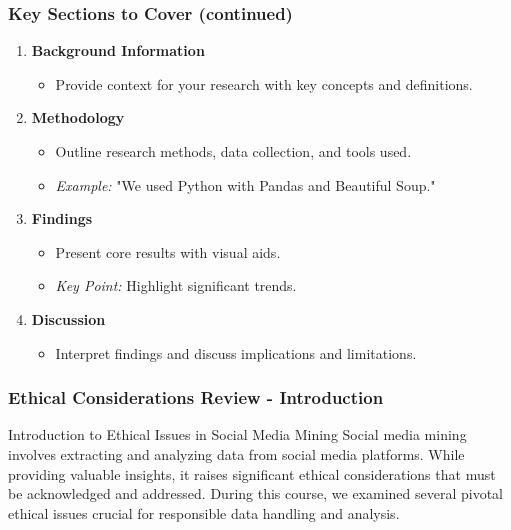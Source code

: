 \documentclass{beamer}
\begin{document}
\begin{frame}[fragile]
    \frametitle{Key Sections to Cover (continued)}
    \begin{enumerate}[resume]
        \item \textbf{Background Information}
            \begin{itemize}
                \item Provide context for your research with key concepts and definitions.
            \end{itemize}

        \item \textbf{Methodology}
            \begin{itemize}
                \item Outline research methods, data collection, and tools used.
                \item \textit{Example:} "We used Python with Pandas and Beautiful Soup."
            \end{itemize}

        \item \textbf{Findings}
            \begin{itemize}
                \item Present core results with visual aids.
                \item \textit{Key Point:} Highlight significant trends.
            \end{itemize}

        \item \textbf{Discussion}
            \begin{itemize}
                \item Interpret findings and discuss implications and limitations.
            \end{itemize}
    \end{enumerate}
\end{frame}

\begin{frame}[fragile]
    \frametitle{Ethical Considerations Review - Introduction}
    \begin{block}{Introduction to Ethical Issues in Social Media Mining}
        Social media mining involves extracting and analyzing data from social media platforms. 
        While providing valuable insights, it raises significant ethical considerations that must be acknowledged and addressed. 
        During this course, we examined several pivotal ethical issues crucial for responsible data handling and analysis.
    \end{block}
\end{frame}
\end{document}
